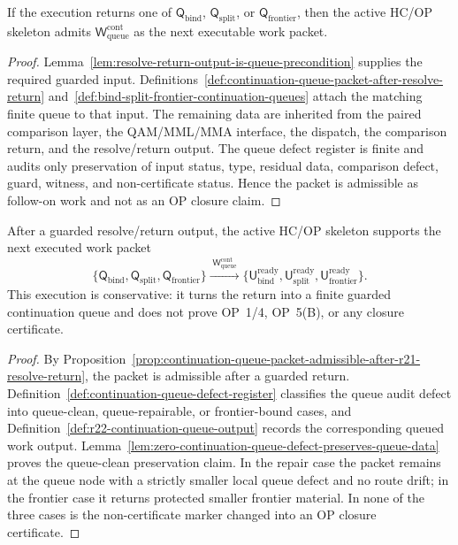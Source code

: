 \begin{proposition}
\label{prop:continuation-queue-packet-admissible-after-r21-resolve-return}
If the execution returns one of \(\mathsf Q_{\mathrm{bind}}\), \(\mathsf Q_{\mathrm{split}}\), or \(\mathsf Q_{\mathrm{frontier}}\), then the active HC/OP skeleton admits \(\mathsf W_{\mathrm{queue}}^{\mathrm{cont}}\) as the next executable work packet.
\end{proposition}

\begin{proof}
Lemma~\ref{lem:resolve-return-output-is-queue-precondition} supplies the required guarded input. Definitions~\ref{def:continuation-queue-packet-after-resolve-return} and~\ref{def:bind-split-frontier-continuation-queues} attach the matching finite queue to that input. The remaining data are inherited from the paired comparison layer, the QAM/MML/MMA interface, the dispatch, the comparison return, and the resolve/return output. The queue defect register is finite and audits only preservation of input status, type, residual data, comparison defect, guard, witness, and non-certificate status. Hence the packet is admissible as follow-on work and not as an OP closure claim.
\end{proof}

\begin{theorem}
\label{thm:first-continuation-queue-packet-after-resolve-return}
After a guarded resolve/return output, the active HC/OP skeleton supports the next executed work packet
\[
 \{\mathsf Q_{\mathrm{bind}},\mathsf Q_{\mathrm{split}},\mathsf Q_{\mathrm{frontier}}\}
 \xrightarrow{\;\mathsf W_{\mathrm{queue}}^{\mathrm{cont}}\;}
 \{\mathsf U_{\mathrm{bind}}^{\mathrm{ready}},
 \mathsf U_{\mathrm{split}}^{\mathrm{ready}},
 \mathsf U_{\mathrm{frontier}}^{\mathrm{ready}}\}.
\]
This execution is conservative: it turns the return into a finite guarded continuation queue and does not prove OP~1/4, OP~5(B), or any closure certificate.
\end{theorem}

\begin{proof}
By Proposition~\ref{prop:continuation-queue-packet-admissible-after-r21-resolve-return}, the packet is admissible after a guarded return. Definition~\ref{def:continuation-queue-defect-register} classifies the queue audit defect into queue-clean, queue-repairable, or frontier-bound cases, and Definition~\ref{def:r22-continuation-queue-output} records the corresponding queued work output. Lemma~\ref{lem:zero-continuation-queue-defect-preserves-queue-data} proves the queue-clean preservation claim. In the repair case the packet remains at the queue node with a strictly smaller local queue defect and no route drift; in the frontier case it returns protected smaller frontier material. In none of the three cases is the non-certificate marker changed into an OP closure certificate.
\end{proof}

